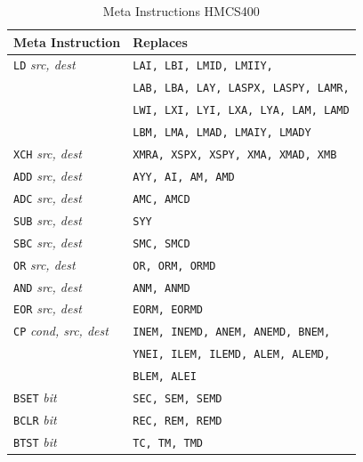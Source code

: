 \documentclass[12pt,twoside]{report}
\newcommand{\tty}[1]{{\tt #1}}
\begin{document}
\begin{table}
\begin{center}\begin{tabular}{|l|l|}
\hline
Meta Instruction          & Replaces \\
\hline
\tty{LD} {\em src, dest}        & \tty{LAI, LBI, LMID, LMIIY,} \\
                                & \tty{LAB, LBA, LAY, LASPX, LASPY, LAMR,} \\
                                & \tty{LWI, LXI, LYI, LXA, LYA, LAM, LAMD} \\
                                & \tty{LBM, LMA, LMAD, LMAIY, LMADY} \\
\tty{XCH} {\em src, dest}       & \tty{XMRA, XSPX, XSPY, XMA, XMAD, XMB} \\
\tty{ADD} {\em src, dest}       & \tty{AYY, AI, AM, AMD} \\
\tty{ADC} {\em src, dest}       & \tty{AMC, AMCD} \\
\tty{SUB} {\em src, dest}       & \tty{SYY} \\
\tty{SBC} {\em src, dest}       & \tty{SMC, SMCD} \\
\tty{OR}  {\em src, dest}       & \tty{OR, ORM, ORMD} \\
\tty{AND} {\em src, dest}       & \tty{ANM, ANMD} \\
\tty{EOR} {\em src, dest}       & \tty{EORM, EORMD} \\
\tty{CP}  {\em cond, src, dest} & \tty{INEM, INEMD, ANEM, ANEMD, BNEM,} \\
                                & \tty{YNEI, ILEM, ILEMD, ALEM, ALEMD,} \\
                                & \tty{BLEM, ALEI} \\
\tty{BSET} {\em bit}            & \tty{SEC, SEM, SEMD} \\
\tty{BCLR} {\em bit}            & \tty{REC, REM, REMD} \\
\tty{BTST} {\em bit}            & \tty{TC, TM, TMD} \\
\hline
\end{tabular}\end{center}
\caption{Meta Instructions HMCS400}
\label{TabHMCS400Meta}
\end{table}
\end{document}
